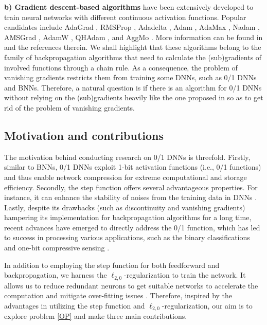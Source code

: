 \documentclass[journal]{IEEEtran}
\begin{document}
 {\bf b) Gradient descent-based algorithms} have been extensively developed to train neural networks with different continuous activation functions. Popular candidates include  AdaGrad \cite{Duchi2011}, RMSProp \cite{Tieleman2012}, Adadelta \cite{Zeiler2012}, Adam \cite{Kingma2014}, AdaMax \cite{Kingma2014}, Nadam \cite{Dozat2016}, AMSGrad \cite{Reddi2018}, AdamW \cite{Loshchilov2019}, QHAdam \cite{Ma2019},  and AggMo \cite{Lucas2019}. More information  can be found in \cite{Ruder2016} and the references therein. We shall highlight that these algorithms belong to the family of backpropagation algorithms that need to calculate the (sub)gradients of involved functions through a chain rule. As a consequence, the problem of vanishing gradients restricts them from training some DNNs, such as 0/1 DNNs and BNNs. Therefore,  a natural question is if there is an algorithm for 0/1 DNNs without relying on the (sub)gradients heavily like the one proposed in \cite{Taylor2016} so as to get rid of the problem of vanishing gradients.


\subsection{Motivation and contributions}
{
The motivation behind conducting research on 0/1 DNNs is threefold.  Firstly,  similar to BNNs, 0/1 DNNs exploit 1-bit activation functions (i.e., 0/1 functions) and thus enable  network compression for extreme computational and storage efficiency.  Secondly,  the step function offers several advantageous properties. For instance, it can enhance the stability of noises from the training data in DNNs \cite{Courbariaux2015, Courbariaux2016, Yuan2021}. Lastly, despite its drawbacks (such as discontinuity and vanishing gradients) hampering its implementation for backpropagation algorithms for a long time, recent advances have emerged to directly address the 0/1 function, which has led to success in processing various applications, such as the binary classifications \cite{Wang2021, Zhou2021} and one-bit compressive sensing \cite{Zhou12022}. }

{
In addition to employing the step function for both feedforward and backpropagation, we harness the $\ell_{2,0}$-regularization to train the network. It allows us to reduce redundant neurons to get suitable networks to accelerate the computation and mitigate over-fitting issues \cite{lin2019, Yang2019, Dinh2020, Zhang2021, Hoefler2021}. Therefore, inspired by the advantages in utilizing the step function and $\ell_{2,0}$-regularization, our aim is to explore problem \eqref{OP} and make three main contributions.}
 
\end{document}
